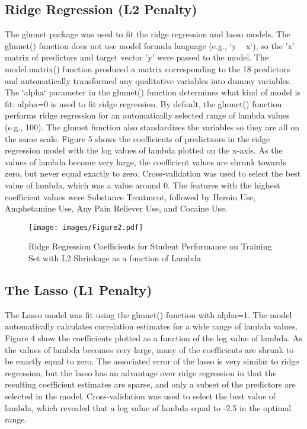 \documentclass[sigconf]{acmart}
\begin{document}

\subsection{Ridge Regression (L2 Penalty)}



The glmnet package was used to fit the ridge regression and lasso models. 
The glmnet() function does not use model formula language (e.g., `y ~ x`), 
so the 'x' matrix of predictors and target vector 'y' were passed to the 
model. The model.matrix() function produced a matrix corresponding to the 
18 predictors and automatically transformed any qualitative variables into
dummy variables. The `alpha` parameter in the glmnet() function determines 
what kind of model is fit: alpha=0 is used to fit ridge regression. 
By default, the glmnet() function performs ridge regression for an 
automatically selected range of lambda values (e.g., 100). The glmnet 
function also standardizes the variables so they are all on the same scale.
Figure 5 shows the coefficients of predictxors in the ridge regression model 
with the log values of lambda plotted on the x-axis. As the values of lambda 
become very large, the coefficient values are shrunk towards zero, but 
never equal exactly to zero. Cross-validation was used to select the best 
value of lambda, which was a value around 0. The features with the highest 
coefficient values were Substance Treatment, followed by Heroin Use, 
Amphetamine Use, Any Pain Reliever Use, and Cocaine Use. 

\begin{figure}[!ht]
  \centering\texttt{[image: images/Figure2.pdf]}
  \caption{Ridge Regression Coefficients for Student Performance on Training Set
  with L2 Shrinkage as a function of Lambda}
  \label{f:Figure2}
\end{figure}



\subsection{The Lasso (L1 Penalty)}

The Lasso model was fit using the glmnet() function with alpha=1. The model
automatically calculates correlation estimates for a wide range of lambda
values. Figure 4 show the coefficients plotted as a function of the log
value of lambda. As the values of lambda becomes very large, many of the 
coefficients are shrunk to be exactly equal to zero. The associated error 
of the lasso is very similar to ridge regression, but the lasso has an 
advantage over ridge regression in that the resulting coefficient estimates 
are sparse, and only a subset of the predictors are selected in the model. 
Cross-validation was used to select the best value of lambda, which 
revealed that a log value of lambda equal to -2.5 in the optimal range.
\end{document}
